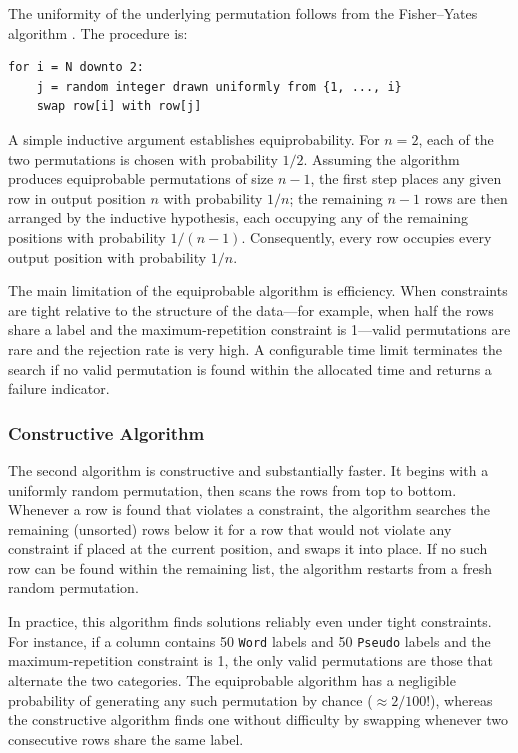 \documentclass[doc,a4paper,biblatex]{apa7}
\begin{document}
The uniformity of the underlying permutation follows from the
Fisher--Yates algorithm \parencite{fisher1938,knuth1997}. The procedure is:

\begin{lstlisting}[caption={Fisher--Yates shuffle (pseudo-code)}]
for i = N downto 2:
    j = random integer drawn uniformly from {1, ..., i}
    swap row[i] with row[j]
\end{lstlisting}

\noindent
A simple inductive argument establishes equiprobability. For $n = 2$,
each of the two permutations is chosen with probability $1/2$. Assuming
the algorithm produces equiprobable permutations of size $n - 1$, the
first step places any given row in output position $n$ with probability
$1/n$; the remaining $n - 1$ rows are then arranged by the inductive
hypothesis, each occupying any of the remaining positions with probability
$1/(n-1)$. Consequently, every row occupies every output position with
probability $1/n$.

The main limitation of the equiprobable algorithm is efficiency. When
constraints are tight relative to the structure of the data---for
example, when half the rows share a label and the maximum-repetition
constraint is 1---valid permutations are rare and the rejection rate is
very high. A configurable time limit terminates the search if no valid
permutation is found within the allocated time and returns a failure
indicator.

\subsubsection{Constructive Algorithm}

The second algorithm is constructive and substantially faster. It begins
with a uniformly random permutation, then scans the rows from top to
bottom. Whenever a row is found that violates a constraint, the algorithm
searches the remaining (unsorted) rows below it for a row that would not
violate any constraint if placed at the current position, and swaps it
into place. If no such row can be found within the remaining list, the
algorithm restarts from a fresh random permutation.

In practice, this algorithm finds solutions reliably even under tight
constraints. For instance, if a column contains 50 \texttt{Word} labels
and 50 \texttt{Pseudo} labels and the maximum-repetition constraint is
1, the only valid permutations are those that alternate the two
categories. The equiprobable algorithm has a negligible probability of
generating any such permutation by chance ($\approx 2 / 100!$), whereas
the constructive algorithm finds one without difficulty by swapping
whenever two consecutive rows share the same label.
\end{document}
